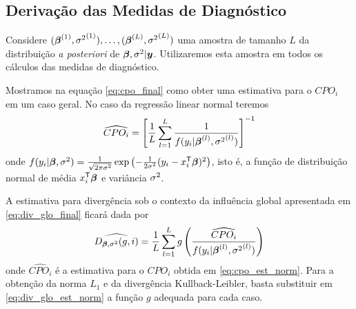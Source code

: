 \subsection{Derivação das Medidas de Diagnóstico}

Considere $({\boldsymbol{\beta}}^{(1)},{\sigma^2}^{(1)}),\ldots,({\boldsymbol{\beta}}^{(L)},{\sigma^2}^{(L)})$ uma amostra de tamanho $L$ da distribuição \textit{a posteriori} de ${\boldsymbol{\beta}},\sigma^2|{\boldsymbol{y}}$. Utilizaremos esta amostra em todos os cálculos das medidas de diagnóstico.

Mostramos na equação \eqref{eq:cpo_final} como obter uma estimativa para o $CPO_i$ em um caso geral. No caso da regressão linear normal teremos
\begin{equation}\label{eq:cpo_est_norm}
\widehat{CPO_i} = \left[\frac{1}{L}\sum_{l=1}^L\frac{1}{f(y_i|{\boldsymbol{\beta}}^{(l)},{\sigma^2}^{(l)})}\right]^{-1}
\end{equation}
onde $f(y_i|{\boldsymbol{\beta}},\sigma^2) = \frac{1}{\sqrt{2\pi\sigma^2}}\exp\left(-\frac{1}{2\sigma^2}(y_i-x_i^{\mathsf{T}}{\boldsymbol{\beta}})^2\right)$, isto é, a função de distribuição normal de média $x_i^{\mathsf{T}}{\boldsymbol{\beta}}$ e variância $\sigma^2$.

A estimativa para divergência sob o contexto da influência global apresentada em  \eqref{eq:div_glo_final} ficará dada por
\begin{equation}\label{eq:div_glo_est_norm}
\widehat{D_{{\boldsymbol{\beta}},\sigma^2}(g,i)} = \frac{1}{L}\sum_{l=1}^L g\left(\frac{\widehat{CPO_i}}{f(y_i|{\boldsymbol{\beta}}^{(l)},{\sigma^2}^{(l)})}\right)
\end{equation}
onde $\widehat{CPO_i}$ é a estimativa para o $CPO_i$ obtida em \eqref{eq:cpo_est_norm}. Para a obtenção da norma $L_1$ e da divergência Kullback-Leibler, basta substituir em \eqref{eq:div_glo_est_norm} a função $g$ adequada para cada caso.

